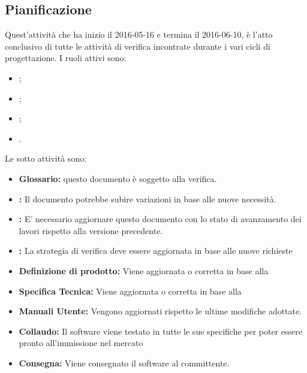 \documentclass[12pt,a4paper]{article}
\begin{document}
\subsection{Pianificazione}
Quest'attività che ha inizio il 2016-05-16 e termina il 2016-06-10, è l'atto conclusivo di tutte le attività di verifica incontrate durante i vari cicli di progettazione. I ruoli attivi sono:
\begin{itemize}
	\item \PM;
	\item \AM;
	\item \PG;
	\item \VR.
\end{itemize}
Le sotto attività sono:
\begin{itemize}
	\item \textbf{Glossario:} 
	questo documento è soggetto alla verifica.
	\item \textbf{\NdP:}
Il documento potrebbe subire variazioni in base
alle nuove necessità.
\item \textbf{\PdP:}
E' necessario aggiornare questo documento con lo stato di avanzamento
dei lavori rispetto alla versione precedente.
\item \textbf{\PdQ:}
La strategia di verifica deve essere aggiornata in base 
alle nuove richieste
\item \textbf{Definizione di prodotto:}
Viene aggiornata o corretta in base alla \RQ
\item \textbf{Specifica Tecnica:}
Viene aggiornata o corretta in base alla \RQ
\item \textbf{Manuali Utente:}
Vengono aggiornati rispetto le ultime modifiche adottate.
\item \textbf{Collaudo:}
Il software viene testato in tutte le sue specifiche per poter essere pronto all'immissione nel mercato
\item \textbf{Consegna:}
Viene consegnato il software al committente.
\end{itemize}

\newpage
\end{document}
